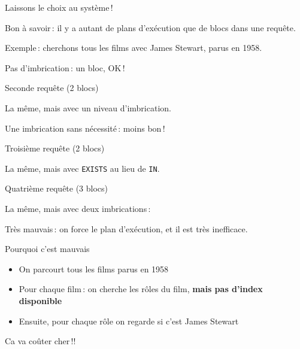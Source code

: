 \begin{tsp}{Laissons le choix au système\,!}
{
Bon à savoir\,: il y a autant de plans d'exécution que
de \alert{blocs} dans une requête.


Exemple\,: cherchons tous les films avec James Stewart, parus
en 1958.\\


Pas d'imbrication\,: un bloc, OK\,!
}\end{tsp}
\begin{tsp}{Seconde requête (2 blocs)}{

La même, mais avec un niveau d'imbrication.


Une imbrication sans nécessité\,: moins bon\,!
}\end{tsp}
\begin{tsp}{Troisième requête (2 blocs)}{

La même, mais avec \texttt{EXISTS} au lieu de \texttt{IN}.\\


}\end{tsp}
\begin{tsp}{Quatrième requête (3 blocs)}{

La même, mais avec deux imbrications\,:\\


Très mauvais\,: on force le plan d'exécution, et il
est très inefficace.

}\end{tsp}
\begin{tsp}{Pourquoi c'est mauvais}{

\begin{itemize}
  \item On parcourt tous les films parus en 1958

  \item Pour chaque film\,: on cherche les rôles
       du film, \textbf{mais pas d'index disponible}
 
  \item Ensuite, pour chaque rôle on regarde si c'est James Stewart
\end{itemize}

Ca va coûter cher\,!!
}\end{tsp}
